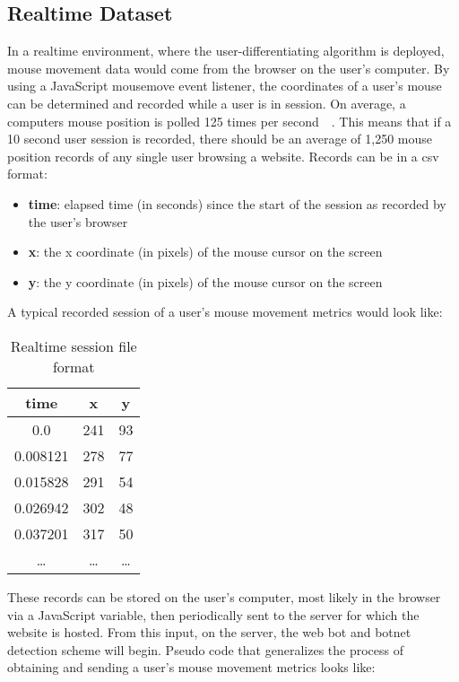 \subsection{Realtime Dataset}\label{subsec:realtime-dataset}
In a realtime environment, where the user-differentiating algorithm is deployed, mouse movement data would come from the browser on the user's computer.
By using a JavaScript mousemove event listener, the coordinates of a user's mouse can be determined and recorded while a user is in session.
On average, a computers mouse position is polled 125 times per second~\cite{mouse_dpi_and_polling_rate_explained}~\cite{mouse_dpi_and_usb_polling_rate}.
This means that if a 10 second user session is recorded, there should be an average of 1,250 mouse position records of any single user browsing a website.
Records can be in a csv format:
\begin{itemize}
    \item \textbf{time}: elapsed time (in seconds) since the start of the session as recorded by the user's browser
    \item \textbf{x}: the x coordinate (in pixels) of the mouse cursor on the screen
    \item \textbf{y}: the y coordinate (in pixels) of the mouse cursor on the screen
\end{itemize}
A typical recorded session of a user's mouse movement metrics would look like:
\begin{table}
    \centering
    \begin{tabular}{ |c|c|c| }
        \hline
        \textbf{time} & \textbf{x} & \textbf{y} \\
        \hline
        0.0 & 241 & 93 \\
        0.008121 & 278 & 77 \\
        0.015828 & 291 & 54 \\
        0.026942 & 302 & 48 \\
        0.037201 & 317 & 50 \\
        \ldots & \ldots & \ldots \\
        \hline
    \end{tabular}
    \caption{Realtime session file format}
    \label{tab:realtime-dataset-format}
\end{table}
These records can be stored on the user's computer, most likely in the browser via a JavaScript variable, then periodically sent to the server for which the website is hosted.
From this input, on the server, the web bot and botnet detection scheme will begin.
Pseudo code that generalizes the process of obtaining and sending a user's mouse movement metrics looks like:

